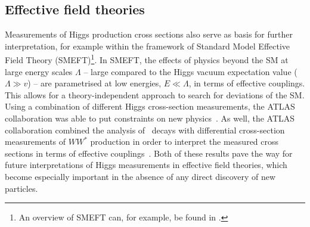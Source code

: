 


\subsection{Effective field theories}
Measurements of Higgs production cross sections also serve as basis for further interpretation, for example within the framework of Standard Model Effective Field Theory (SMEFT)\footnote{An overview of SMEFT can, for example, be found in \ccite{}.}. In SMEFT, the effects of physics beyond the SM at large energy scales $\Lambda$ -- large compared to the Higgs vacuum expectation value ($\Lambda \gg v$) -- are parametrised at low energies, $E \ll \Lambda$, in terms of effective couplings. 
This allows for a theory-independent approach to search for deviations of the SM. 
Using a combination of different Higgs cross-section measurements, the ATLAS collaboration was able to put constraints on new physics~\cite{ATLAS-CONF-2020-053}.
As well, the ATLAS collaboration combined the analysis of \HWW\ decays with differential cross-section measurements of $WW^*$ production in order to interpret the measured cross sections in terms of effective couplings~\cite{ATL-PHYS-PUB-2021-010}.
Both of these results pave the way for future interpretations of Higgs measurements in effective field theories, which become especially important in the absence of any direct discovery of new particles. 




